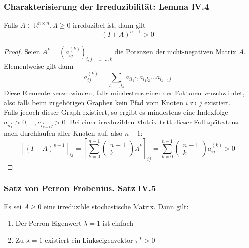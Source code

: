 \documentclass[]{article}
\begin{document}
\subsubsection*{Charakterisierung der Irreduzibilität: Lemma IV.4}
Falls $A \in \mathbb{R}^{n \times n}, A \geq 0$ irreduzibel ist, dann gilt
\[ (I + A)^{n-1} > 0 \]
\begin{proof}
	Seien $A^k = (a_{ij}^{(k)} )_{i,j = 1, \dotsc, k}$ die Potenzen der nicht-negativen Matrix $A$. Elementweise gilt dann
	\begin{equation*}
	a_{ij}^{(k)} = \sum_{l_1, \dotsc, l_k} a_{i l_1} \cdot, a_{l_1 l_2} \dots a_{l_{k-1} j}
	\end{equation*}
	Diese Elemente verschwinden, falls mindestens einer der Faktoren verschwindet, also falls beim zugehörigen Graphen kein Pfad vom Knoten $i$ zu $j$ existiert. \\
	Falls jedoch dieser Graph existiert, so ergibt es mindestens eine Indexfolge $a_{i l^*_1} >0, \dotsc, a_{l^*_{k-1} j} >0$. Bei einer irreduziblen Matrix tritt dieser Fall spätestens nach durchlaufen aller Knoten auf, also $n-1$:
	\begin{equation*}
	\left[ (I + A)^{n-1} \right]_{ij} = \left[ \sum_{k=0}^{n-1} \begin{pmatrix} n-1 \\ k \end{pmatrix} A^k \right]_{ij} = \sum_{k=0}^{n-1} \begin{pmatrix} n-1 \\ k \end{pmatrix} a_{ij}^{(k)} > 0
	\end{equation*}
	\end{proof}

\subsubsection*{Satz von Perron Frobenius. Satz IV.5}	
Es sei $A \geq 0$ eine irreduzible stochastische Matrix. Dann gilt:
\begin{enumerate}
	\item Der Perron-Eigenwert $\lambda = 1$ ist einfach
	\item Zu $\lambda=1$ existiert ein Linkseigenvektor $\pi^T > 0$
\end{enumerate}
\end{document}
